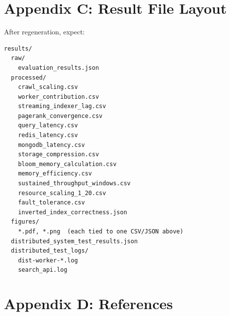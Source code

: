 \documentclass[11pt,a4paper]{article}
\begin{document}
\section{Appendix C: Result File Layout}

After regeneration, expect:

\begin{verbatim}
results/
  raw/
    evaluation_results.json
  processed/
    crawl_scaling.csv
    worker_contribution.csv
    streaming_indexer_lag.csv
    pagerank_convergence.csv
    query_latency.csv
    redis_latency.csv
    mongodb_latency.csv
    storage_compression.csv
    bloom_memory_calculation.csv
    memory_efficiency.csv
    sustained_throughput_windows.csv
    resource_scaling_1_20.csv
    fault_tolerance.csv
    inverted_index_correctness.json
  figures/
    *.pdf, *.png  (each tied to one CSV/JSON above)
  distributed_system_test_results.json
  distributed_test_logs/
    dist-worker-*.log
    search_api.log
\end{verbatim}

\section{Appendix D: References}
\end{document}
